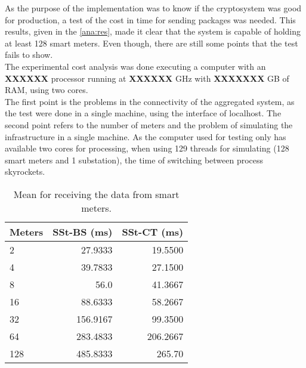 
   As the purpose of the implementation was to know if the cryptosystem was
   good for production, a test of the cost in time for sending packages was
   needed. This results, given in the \ref{ana:res}, made it clear that
   the system is capable of holding at least 128 smart meters. Even though,
   there are still some points that the test fails to show.\\
   The experimental cost analysis was done executing a computer with an \textbf{XXXXXX} processor running at \textbf{XXXXXX} GHz with \textbf{XXXXXXX} GB of RAM, using two cores.\\ %
   The first point is the problems in the connectivity of the aggregated system, as the test were done in a single machine, using the interface of localhost.
   The second point refers to the number of meters and the problem of simulating the infrastructure in a single machine. As the computer used for testing only has available two cores for processing, when using 129 threads for simulating (128 smart meters and 1 substation), the time of switching between process skyrockets.
   
   \begin{table}
   		\centering
   		\begin{tabular}{l|rr}
   			Meters & SSt-BS (ms) & SSt-CT (ms) \\ \hline
   			2      &     27.9333 &     19.5500 \\
   			4      &     39.7833 &     27.1500 \\
   			8      &        56.0 &     41.3667 \\
   			16     &     88.6333 &     58.2667 \\
   			32     &    156.9167 &     99.3500 \\
   			64     &    283.4833 &    206.2667 \\
   			128    &    485.8333 &      265.70
   		\end{tabular}
   		\caption{Mean for receiving the data from smart meters.}
   		\label{ana:tab1}
   \end{table}

